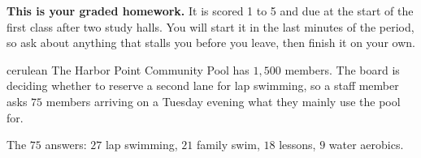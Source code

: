 \documentclass[12pt]{article}
\begin{document}

\vspace{0.12in}

\begin{remindbox}
\small
\textbf{This is your graded homework.} It is scored 1 to 5 and due at the start of the
first class after two study halls. You will start it in the last minutes of the period, so ask about anything that stalls
you before you leave, then finish it on your own.
\end{remindbox}

\vspace{0.08in}

\boxguard[20]
\begin{scenariobox}{cerulean}
The Harbor Point Community Pool has $1{,}500$ members. The board is deciding whether to
reserve a second lane for lap swimming, so a staff member asks $75$ members arriving on a
Tuesday evening what they mainly use the pool for.

\vspace{2pt}
The $75$ answers: $27$ lap swimming, $21$ family swim, $18$ lessons, $9$ water aerobics.
\end{scenariobox}

\vspace{0.08in}
\end{document}
